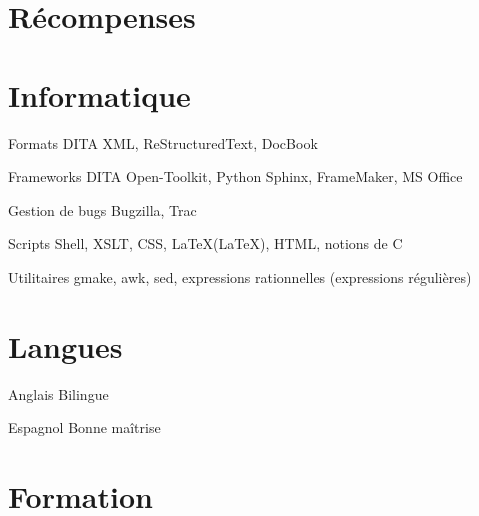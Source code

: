 \documentclass[12pt,a4paper,roman]{moderncv}
\begin{document}

\section{Récompenses}



\section{Informatique}

\cvitem
    {Formats}
    {DITA XML, ReStructuredText, DocBook}

\cvitem
    {Frameworks}
    {DITA Open-Toolkit, Python Sphinx, FrameMaker, MS Office}

\cvitem
    {Gestion de bugs}
    {Bugzilla, Trac}

 {Scripts Shell, XSLT, CSS, \LaTeX (LaTeX), HTML, notions de
  C}

\cvitem
    {Utilitaires}
    {gmake, awk, sed, expressions rationnelles (expressions
      régulières)}


\section{Langues}

\cvitem
    {Anglais}
    {Bilingue}

\cvitem
    {Espagnol}
    {Bonne maîtrise}


\section{Formation}
\end{document}
